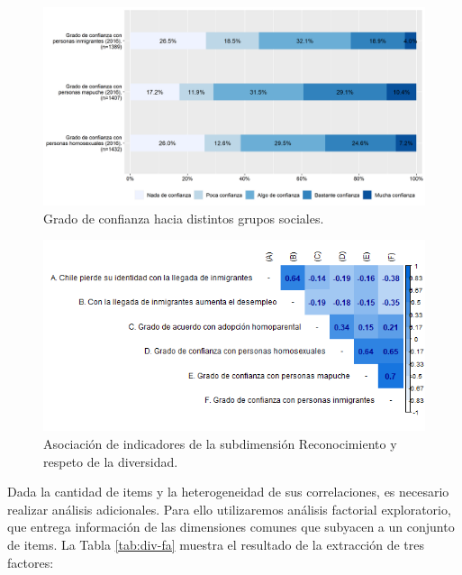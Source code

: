 \documentclass[
  12pt,
]{book}
\begin{document}
\begin{figure}[H]

{\centering \includegraphics[width=1\linewidth,height=1\textheight]{output/graphs/diversidad} 

}

\caption{Grado de confianza hacia distintos grupos sociales.}\label{fig:diversidad}
\end{figure}

\begin{figure}[H]

{\centering \includegraphics[width=1\linewidth,height=1\textheight]{output/graphs/diversidad_cor} 

}

\caption{Asociación de indicadores de la subdimensión Reconocimiento y respeto de la diversidad.}\label{fig:diversidad-cor}
\end{figure}

Dada la cantidad de items y la heterogeneidad de sus correlaciones, es necesario realizar análisis adicionales. Para ello utilizaremos análisis factorial exploratorio, que entrega información de las dimensiones comunes que subyacen a un conjunto de items. La Tabla \ref{tab:div-fa} muestra el resultado de la extracción de tres factores:
\end{document}
